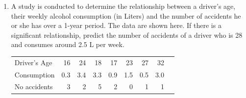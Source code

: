 \documentclass{article}
\begin{document}
\begin{enumerate}
    \item A study is conducted to determine the relationship between a driver’s age, their weekly alcohol consumption (in Liters) and the number of accidents he or she has over a 1-year period. The data are shown here. If there is a significant relationship, predict the number of accidents of a driver who is 28 and consumes around 2.5 L per week.
    \begin{table}[H]
    \begin{tabular}{lrrrrrrrr}
    Driver's Age & 16 & 24 & 18 & 17 & 23 & 27 & 32 \\
    Consumption & 0.3 & 3.4 & 3.3 & 0.9 & 1.5 & 0.5 & 3.0 \\
    No accidents & 3 & 2 & 5 & 2 & 0 & 1 & 1
    \end{tabular}
    \end{table}
    

\end{enumerate}
\end{document}

